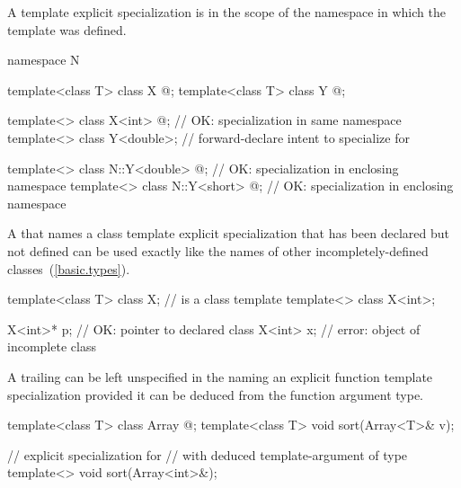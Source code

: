 \pnum
A template explicit specialization is in the scope of the namespace in which
the template was defined.
\begin{example}

\begin{codeblock}
namespace N {
  template<class T> class X { @\commentellip@ };
  template<class T> class Y { @\commentellip@ };

  template<> class X<int> { @\commentellip@ };        // OK: specialization in same namespace
  template<> class Y<double>;                   // forward-declare intent to specialize for 
}

template<> class N::Y<double> { @\commentellip@ };    // OK: specialization in enclosing namespace
template<> class N::Y<short> { @\commentellip@ };     // OK: specialization in enclosing namespace
\end{codeblock}
\end{example}

\pnum
A
that names a class template explicit specialization that has been declared but
not defined can be used exactly like the names of other incompletely-defined
classes~(\ref{basic.types}).
\begin{example}

\begin{codeblock}
template<class T> class X;                      //  is a class template
template<> class X<int>;

X<int>* p;                                      // OK: pointer to declared class 
X<int> x;                                       // error: object of incomplete class 
\end{codeblock}
\end{example}

\pnum
A trailing
can be left unspecified in the
naming an explicit function template specialization
provided it can be deduced from the function argument type.
\begin{example}

\begin{codeblock}
template<class T> class Array { @\commentellip@ };
template<class T> void sort(Array<T>& v);

// explicit specialization for 
// with deduced template-argument of type 
template<> void sort(Array<int>&);
\end{codeblock}
\end{example}

